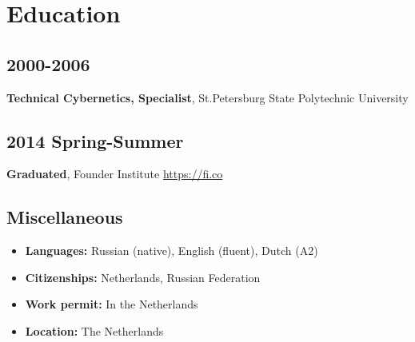\section*{Education}

\subsection*{2000-2006}
\textbf{Technical Cybernetics, Specialist}, St.Petersburg State Polytechnic University

\subsection*{2014 Spring-Summer}
\textbf{Graduated}, Founder Institute \href{https://fi.co}{https://fi.co}

\subsection*{Miscellaneous}
\begin{itemize}[noitemsep, nosep]
  \item \textbf{Languages:} Russian (native), English (fluent), Dutch (A2)
  \item \textbf{Citizenships:} Netherlands, Russian Federation
  \item \textbf{Work permit:} In the Netherlands
  \item \textbf{Location:} The Netherlands
\end{itemize}
